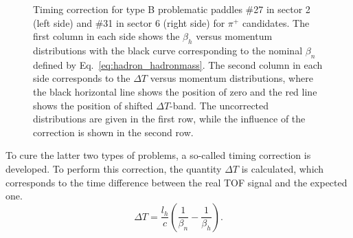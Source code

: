 \begin{figure}[htp]
\begin{center}
\caption{\small Timing correction for type B problematic paddles \#27 in sector 2 (left side) and \#31 in sector 6 (right side) for $\pi^+$ candidates. The first column in each side shows the $\beta_{h}$ versus momentum distributions with the black curve corresponding to the nominal $\beta_{n}$ defined by Eq.~\eqref{eq:hadron_hadronmass}. The second column in each side corresponds to the $\Delta T$ versus momentum distributions, where the black horizontal line shows the position of zero and the red line shows the position of shifted $\Delta T$-band. The uncorrected distributions are given in the first row, while the influence of the correction is shown in the second row.  \label{fig:shifted_paddles}} 
\end{center}
\end{figure}


To cure the latter two types of problems, a so-called timing correction is developed. To perform this correction, the quantity $\Delta T$ is calculated, which corresponds to the time difference between the real TOF signal and the expected one.
\begin{equation}
\Delta T = \frac{l_{h}}{c}\left (\frac{1}{\beta_{n}} - \frac{1}{\beta_{h}}  \right ).
\label{eq:delta_t}
\end{equation}


